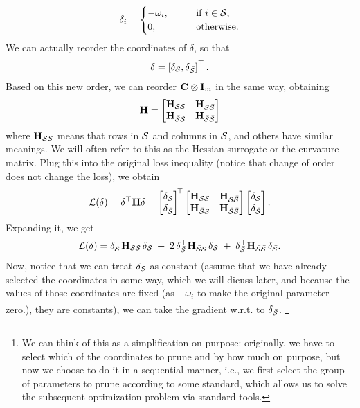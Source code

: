 \documentclass[11pt]{article}  %
\begin{document}
\begin{align*}
  \delta_i = \begin{cases}
    - \omega_i, \qquad &\text{if } i \in \mathcal{S}, \\
    0, \qquad &\text{otherwise}.
  \end{cases}
\end{align*}
We can actually reorder the coordinates of $\delta$, so that 
\begin{align*}
  \delta = \left[ \delta_{\mathcal{S}}, \delta_{\bar{\mathcal{S}}} \right]^{\top}.
\end{align*}
Based on this new order, we can reorder $\mathbf{C} \otimes \mathbf{I}_m$ in the same way, obtaining 
\begin{align*}
  \mathbf{H} = \begin{bmatrix}
    \mathbf{H}_{\mathcal{S}\mathcal{S}} & \mathbf{H}_{\mathcal{S}\bar{\mathcal{S}}} \\
    \mathbf{H}_{\bar{\mathcal{S}}\mathcal{S}} & \mathbf{H}_{\bar{\mathcal{S}}\bar{\mathcal{S}}} \\
  \end{bmatrix}
\end{align*}
where $\mathbf{H}_{\mathcal{S}\mathcal{S}}$ means that rows in $\mathcal{S}$ and columns in $\mathcal{S}$, and others have similar meanings.
We will often refer to this as the Hessian surrogate or the curvature matrix.
Plug this into the original loss inequality (notice that change of order does not change the loss), we obtain 
\[
  \mathcal{L}(\delta) = \delta^\top \mathbf{H} \delta = \begin{bmatrix}
    \delta_{\mathcal{S}} \\
    \delta_{\bar {\mathcal{S}}}
  \end{bmatrix}^{\!\top} \begin{bmatrix}
    \mathbf{H}_{\mathcal{S}\mathcal{S}} & \mathbf{H}_{\mathcal{S}\bar {\mathcal{S}}} \\
    \mathbf{H}_{\bar {\mathcal{S}} \mathcal{S}} & \mathbf{H}_{\bar {\mathcal{S}} \bar {\mathcal{S}}}
  \end{bmatrix} \begin{bmatrix}
    \delta_{\mathcal{S}} \\
    \delta_{\bar {\mathcal{S}}}
  \end{bmatrix}.
\]
Expanding it, we get 
\[
  \mathcal{L}(\delta) = \delta_{\mathcal{S}}^\top \mathbf{H}_{\mathcal{S}\mathcal{S}} \,\delta_{\mathcal{S}} \;+\;
  2\,\delta_{\bar {\mathcal{S}}}^\top \mathbf{H}_{\bar {\mathcal{S}} \mathcal{S}}\,\delta_{\mathcal{S}} \;+\;
  \delta_{\bar {\mathcal{S}}}^\top \mathbf{H}_{\bar {\mathcal{S}} \bar {\mathcal{S}}}\,\delta_{\bar {\mathcal{S}}}.
\]
Now, notice that we can treat $\delta_{\mathcal{S}}$ as constant (assume that we have already selected the coordinates in some way, which we will dicuss later, and because the values of those coordinates are fixed (as $-\omega_i$ to make the original parameter zero.), they are constants), we can take the gradient w.r.t. to $\delta_{\bar{\mathcal{S}}}$. \footnote{We can think of this as a simplification on purpose: originally, we have to select which of the coordinates to prune and by how much on purpose, but now we choose to do it in a sequential manner, i.e., we first select the group of parameters to prune according to some standard, which allows us to solve the subsequent optimization problem via standard tools.}
\end{document}
